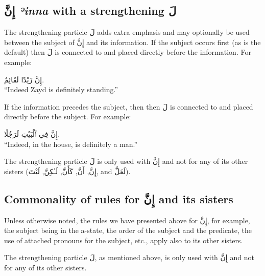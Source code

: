 \documentclass[
  10pt,
]{book}
\begin{document}
\subsection{\texorpdfstring{\foreignlanguage{arabic}{إِنَّ} \emph{ʾinna} with a strengthening \foreignlanguage{arabic}{لَ}}{إِنَّ ʾinna with a strengthening لَ}}\label{ux625ux646-einna-with-a-strengthening-ux644}

The strengthening particle \foreignlanguage{arabic}{لَ} adds extra emphasis and may optionally be used between the subject of \foreignlanguage{arabic}{إِنَّ} and its information.
If the subject occurs first (as is the default) then \foreignlanguage{arabic}{لَ} is connected to and placed directly before the information. For example:

\foreignlanguage{arabic}{إِنَّ زَيْدًا لَقَائِمٌ.}\\
\enquote{Indeed Zayd is definitely standing.}

If the information precedes the subject, then then \foreignlanguage{arabic}{لَ} is connected to and placed directly before the subject. For example:

\foreignlanguage{arabic}{إِنَّ فِي ٱلْبَيْتِ لَرَجُلًا.}\\
\enquote{Indeed, in the house, is definitely a man.}

The strengthening particle \foreignlanguage{arabic}{لَ} is only used with \foreignlanguage{arabic}{إِنَّ} and not for any of its other sisters
(\foreignlanguage{arabic}{إِنَّ},
\foreignlanguage{arabic}{أَنَّ},
\foreignlanguage{arabic}{کَأَنَّ},
\foreignlanguage{arabic}{لَـٰکِنَّ},
\foreignlanguage{arabic}{لَيْتَ}, and
\foreignlanguage{arabic}{لَعَلَّ}).

\subsection{\texorpdfstring{Commonality of rules for \foreignlanguage{arabic}{إِنَّ} and its sisters}{Commonality of rules for إِنَّ and its sisters}}\label{commonality-of-rules-for-ux625ux646-and-its-sisters}

Unless otherwise noted, the rules we have presented above for
\foreignlanguage{arabic}{إِنَّ},
for example, the subject being in the a-state, the order of the subject and the predicate, the use of attached pronouns for the subject, etc.,
apply also to its other sisters.

The strengthening particle \foreignlanguage{arabic}{لَ}, as mentioned above, is only used with \foreignlanguage{arabic}{إِنَّ} and not for any of its other sisters.
\end{document}
